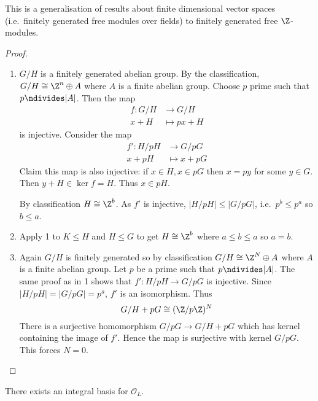 \documentclass[a4paper]{article}
\renewcommand*{\O}{\mathcal{O}}
\begin{document}
This is a generalisation of results about finite dimensional vector spaces (i.e.\ finitely generated free modules over fields) to finitely generated free \(\Z\)-modules.

\begin{proof}\leavevmode
  \begin{enumerate}
  \item \(G/H\) is a finitely generated abelian group. By the classification, \(G/H \cong \Z^n \oplus A\) where \(A\) is a finite abelian group. Choose \(p\) prime such that \(p \ndivides |A|\). Then the map
    \begin{align*}
      f: G/H &\to G/H \\
      x + H &\mapsto px + H
    \end{align*}
    is injective. Consider the map
    \begin{align*}
      f': H/pH &\to G/pG \\
      x + pH &\mapsto x + pG
    \end{align*}
    Claim this map is also injective: if \(x \in H, x \in pG\) then \(x = py\) for some \(y \in G\). Then \(y + H \in \ker f = H\). Thus \(x \in pH\).

    By classification \(H \cong \Z^b\). As \(f'\) is injective, \(|H/pH| \leq |G/pG|\), i.e.\ \(p^b \leq p^a\) so \(b \leq a\).
  \item Apply 1 to \(K \leq H\) and \(H \leq G\) to get \(H \cong \Z^b\) where \(a \leq b \leq a\) so \(a = b\).
  \item Again \(G/H\) is finitely generated so by classification \(G/H \cong \Z^N \oplus A\) where \(A\) is a finite abelian group. Let \(p\) be a prime such that \(p \ndivides |A|\). The same proof as in 1 shows that \(f': H/pH \to G/pG\) is injective. Since \(|H/pH| = |G/pG| = p^a\), \(f'\) is an isomorphism. Thus
    \[
      G/H + pG \cong (\Z/p\Z)^N
    \]
    There is a surjective homomorphism \(G/pG \to G/H + pG\) which has kernel containing the image of \(f'\). Hence the map is surjective with kernel \(G/pG\). This forces \(N = 0\).
  \end{enumerate}
\end{proof}

\begin{proposition}
  There exists an integral basis for \(\O_L\).
\end{proposition}
\end{document}
